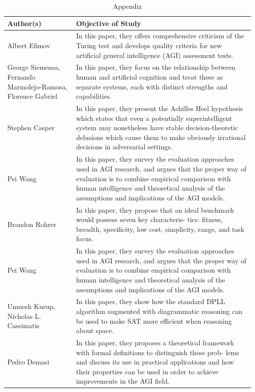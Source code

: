 \documentclass{article}
\begin{document}
\begin{table}
    \caption{Appendix}
    \centering
    \renewcommand{\arraystretch}{3}
    \begin{tabular}{ |p{5cm}|p{10cm}|  }
    \hline
    Author(s) & Objective of Study\\
    \hline
    Albert Efimov & In this paper, they offers comprehensive criticism of the Turing test and develops quality criteria for new artificial general intelligence (AGI) assessment tests. \\

    George Siemensa, Fernando Marmolejo-Ramosa, Florence Gabriel & In this paper, they focus on the relationship between human and artificial cognition and treat these as separate systems, each with distinct strengths and capabilities. \\

    Stephen Casper & In this paper, they present the Achilles Heel hypothesis which states that even a potentially superintelligent system may nonetheless have stable decision-theoretic delusions which cause them to make obviously irrational decisions in adversarial settings. \\

    Pei Wang & In this paper, they survey the evaluation approaches used in AGI research, and argues that the proper way of evaluation is to combine empirical comparison with human intelligence and theoretical analysis of the assumptions and implications of the AGI models. \\

    Brandon Rohrer & In this paper, they propose that an ideal benchmark would possess seven key characteris- tics: fitness, breadth, specificity, low cost, simplicity, range, and task focus. \\ 

    Pei Wang & In this paper, they survey the evaluation approaches used in AGI research, and argues that the proper way of evaluation is to combine empirical comparison with human intelligence and theoretical analysis of the assumptions and implications of the AGI models. \\

    Unmesh Kurup, Nicholas L. Cassimatis & In this paper, they show how the standard DPLL algorithm augmented with diagrammatic reasoning can be used to make SAT more efficient when reasoning about space. \\

    Pedro Demasi & In this paper, they proposes a theoretical framework with formal definitions to distinguish these prob- lems and discuss its use in practical applications and how their properties can be used in order to achieve improvements in the AGI field. \\


    \hline
    \end{tabular}
\end{table}
\end{document}
